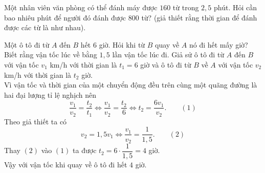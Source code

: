 \begin{vn}
	Một nhân viên văn phòng có thể đánh máy được $ 160 $ từ trong $ 2,5 $ phút. Hỏi cần bao nhiêu phút để người đó đánh được $ 800 $ từ? (giả thiết rằng thời gian để đánh được các từ là như nhau).
\end{vn}
\begin{vn}
	Một ô tô đi từ $A$ đến $B$ hết $6$ giờ. Hỏi khi từ $B$ quay về $A$ nó đi hết mấy giờ? Biết rằng vận tốc lúc về bằng $1{,}5$ lần vận tốc lúc đi.
	\loigiai
	{
		Giả sử ô tô đi từ $A$ đến $B$ với vận tốc $v_1$ km/h với thời gian là $t_1=6$ giờ và ô tô đi từ $B$ về $A$ với vận tốc $v_2$ km/h với thời gian là $t_2$ giờ.\\
		Vì vận tốc và thời gian của một chuyển động đều trên cùng một quãng đường là hai đại lượng tỉ lệ nghịch nên
		$$	\dfrac{v_1}{v_2} = \dfrac{t_2}{t_1} \Leftrightarrow \dfrac{v_1}{v_2} = \dfrac{t_2}{6} \Leftrightarrow t_2 = \dfrac{6v_1}{v_2}. \qquad (1)		$$
		Theo giả thiết ta có
		$$
		v_2=1{,}5v_1 \Leftrightarrow \dfrac{v_1}{v_2} = \dfrac{1}{1{,}5}. \qquad (2)
		$$
		Thay $ (2) $ vào $ (1) $ ta được $t_2=6\cdot\dfrac{1}{1{,}5} = 4$ giờ.\\
		Vậy với vận tốc khi quay về ô tô đi hết $4$ giờ.
	}
\end{vn}

